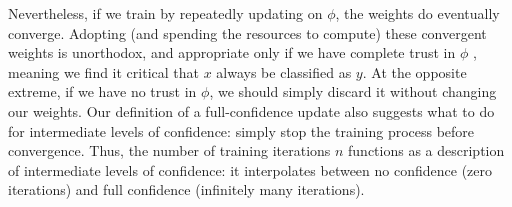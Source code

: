 \begin{example}
Nevertheless, if we train by repeatedly updating on $\phi$, the weights do eventually converge.%
Adopting (and spending the resources to compute) these convergent weights is
unorthodox, and
appropriate only if we have complete trust in $\phi$
\unskip, meaning we find it critical that $x$ always be classified as $y$.
At the opposite extreme, if we have no trust in $\phi$, we should simply discard it without changing our weights. 
Our definition of a full-confidence update 
also suggests what to do for intermediate levels of confidence:
simply stop the training process before convergence.
Thus, the number of training iterations $n$ 
functions as a description of 
intermediate levels of confidence: it interpolates
between no confidence (zero iterations) and full confidence 
(infinitely many iterations).

\end{example}
